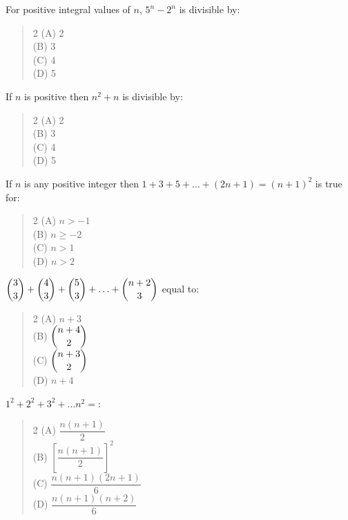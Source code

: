 \documentclass[11pt,a4paper]{article}
\begin{document}
\begin{mcqlist}
\item For positive integral values of $n$, $5^n-2^n$ is divisible by:
\begin{quote}\begin{multicols}{2}
\noindent (A) 2 \\
(B) 3 \\
(C) 4 \\
(D) 5
\end{multicols}\end{quote}

\item If $n$ is positive then $n^2+n$ is divisible by:
\begin{quote}\begin{multicols}{2}
\noindent (A) 2 \\
(B) 3 \\
(C) 4 \\
(D) 5
\end{multicols}\end{quote}

\item If $n$ is any positive integer then $1+3+5+\ldots+(2n+1)=(n+1)^2$ is true for:
\begin{quote}\begin{multicols}{2}
\noindent (A) $n>-1$ \\
(B) $n\geq-2$ \\
(C) $n>1$ \\
(D) $n>2$
\end{multicols}\end{quote}

\item $\dbinom{3}{3}+\dbinom{4}{3}+\dbinom{5}{3}+\ldots+\dbinom{n+2}{3}$ equal to:
\begin{quote}\begin{multicols}{2}
\noindent (A) $n+3$ \\
(B) $\dbinom{n+4}{2}$ \\
(C) $\dbinom{n+3}{2}$ \\
(D) $n+4$
\end{multicols}\end{quote}

\item $1^2+2^2+3^2+\ldots n^2=$:
\begin{quote}\begin{multicols}{2}
\noindent (A) $\dfrac{n(n+1)}{2}$ \\
(B) $\left[\dfrac{n(n+1)}{2}\right]^2$ \\
(C) $\dfrac{n(n+1)(2n+1)}{6}$ \\
(D) $\dfrac{n(n+1)(n+2)}{6}$
\end{multicols}\end{quote}


\end{mcqlist}
\end{document}
